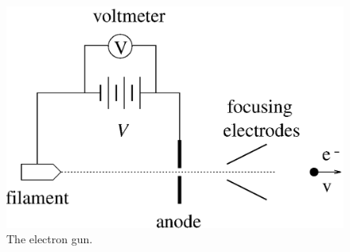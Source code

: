 \begin{figure}[htb]
\centering \epsfxsize=8cm \includegraphics[scale=0.6]{3_electrondynamics/electrongun.eps}
\caption{The electron gun.}
\label{fig:ed:electrongun}
\end{figure}

